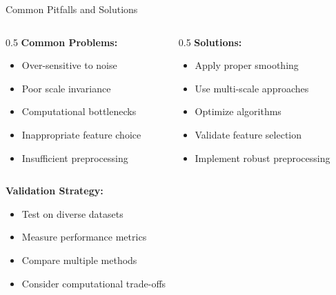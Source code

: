 \documentclass[aspectratio=169,10pt]{beamer}
\begin{document}
\begin{frame}{Common Pitfalls and Solutions}
    \begin{columns}[c]
        \begin{column}{0.5\textwidth}
            \textbf{Common Problems:}
            \begin{itemize}
                \item Over-sensitive to noise
                \item Poor scale invariance
                \item Computational bottlenecks
                \item Inappropriate feature choice
                \item Insufficient preprocessing
            \end{itemize}
        \end{column}
        \begin{column}{0.5\textwidth}
            \textbf{Solutions:}
            \begin{itemize}
                \item Apply proper smoothing
                \item Use multi-scale approaches
                \item Optimize algorithms
                \item Validate feature selection
                \item Implement robust preprocessing
            \end{itemize}
        \end{column}
    \end{columns}

    \textbf{Validation Strategy:}
    \begin{itemize}
        \item Test on diverse datasets
        \item Measure performance metrics
        \item Compare multiple methods
        \item Consider computational trade-offs
    \end{itemize}
\end{frame}
\end{document}
